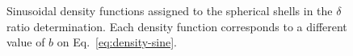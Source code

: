 \documentclass[extra, referee]{gji}
\begin{document}
\begin{figure}
\centering
{}
\caption{
    Sinusoidal density functions assigned to the spherical shells in the $\delta$ ratio
    determination.
    Each density function corresponds to a different value of $b$ on
    Eq.~\ref{eq:density-sine}.
}
\label{fig:sine-densities}
\end{figure}
\end{document}
